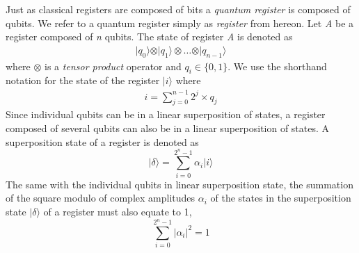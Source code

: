 Just as classical registers are composed of bits a \textit{quantum register} is composed of qubits. We refer to a quantum register simply as \textit{register} from hereon. Let \textit{A} be a register composed of \textit{n} qubits. The state of register \textit{A} is denoted as 
\begin{align*}
\vert q_0 \rangle \otimes \vert q_1 \rangle \otimes \ldots \otimes \vert q_{n-1} \rangle
\end{align*} 
where $\otimes$ is a \textit{tensor product} operator and $q_i \in \{0,1\}$. We use the shorthand notation for the state of the register $\vert i \rangle$ where 
\begin{align*}
i = \sum_{j=0}^{n-1} 2^{j} \times q_j
\end{align*}
Since individual qubits can be in a linear superposition of states, a register composed of several qubits can also be in a linear superposition of states. A superposition state of a register is denoted as 
\begin{equation}
	\label{eqn:uniform-superposition}
	\vert \delta \rangle = \sum_{i=0}^{2^n-1} \alpha_i \vert i \rangle
\end{equation}
The same with the individual qubits in linear superposition state, the summation of the square modulo of complex amplitudes $\alpha_i$ of the states in the superposition state $\vert \delta \rangle$ of a register must also equate to 1,
\[
	\sum_{i=0}^{2^n-1} \vert \alpha_i \vert^2 = 1
\]

